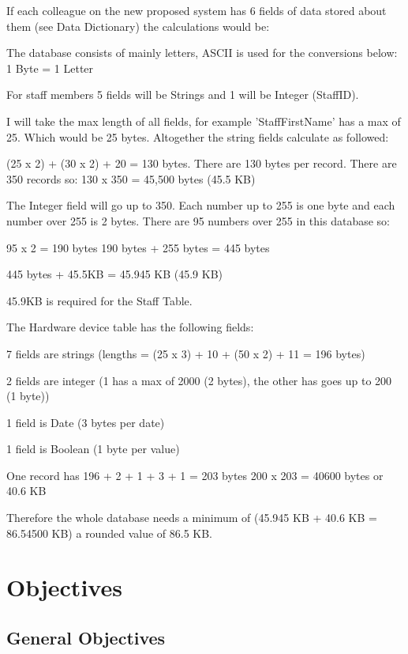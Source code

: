 If each colleague on the new proposed system has 6 fields of data stored about them (see Data Dictionary) the calculations would be:


The database consists of mainly letters, ASCII is used for the conversions below:
1 Byte = 1 Letter

For staff members 5 fields will be Strings and 1 will be Integer (StaffID).


I will take the max length of all fields, for example 'StaffFirstName' has a max of 25. Which would be 25 bytes. Altogether the string fields calculate as followed:

(25 x 2) + (30 x 2) + 20 = 130 bytes. 
There are 130 bytes per record.
There are 350 records so:
130 x 350 = 45,500 bytes (45.5 KB)

The Integer field will go up to 350. Each number up to 255 is one byte and each number over 255 is 2 bytes. There are 95 numbers over 255 in this database so: 

95 x 2 = 190 bytes
190 bytes + 255 bytes = 445 bytes

445 bytes + 45.5KB =  45.945 KB (45.9 KB) 

45.9KB is required for the Staff Table.

The Hardware device table has the following fields:

7 fields are strings (lengths = (25 x 3) + 10 + (50 x 2) + 11 = 196 bytes)

2 fields are integer (1 has a max of 2000 (2 bytes), the other has goes up to 200 (1 byte))

1 field is Date (3 bytes per date)

1 field is Boolean (1 byte per value)

One record has 196 + 2 + 1 + 3 + 1 = 203 bytes
200 x 203 = 40600 bytes or 40.6 KB

Therefore the whole database needs a minimum of (45.945 KB + 40.6 KB = 86.54500 KB) a rounded value of 86.5 KB.


\section{Objectives}

\subsection{General Objectives}


